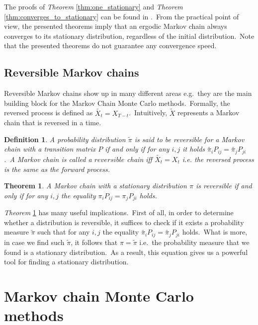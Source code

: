 \documentclass[shortabstract, english, lic]{iithesis}
\newcommand\numberedchapter[1]{\setlength\topskip{3cm}\chapter{#1}\setlength\topskip{0cm}}
\theoremstyle{default_theorem_style}\newtheorem{theorem}{Theorem}
\theoremstyle{default_theorem_style}\newtheorem{definition}{Definition}
\begin{document}
\noindent The proofs of \textit{Theorem} \ref{thm:one_stationary} and \textit{Theorem}
\ref{thm:converges_to_stationary} can be found in \cite{markov_chains_book}.\ From the practical point of view, the
presented theorems imply that an ergodic Markov chain always converges to its stationary distribution, regardless of
the initial distribution.\ Note that the presented theorems do not guarantee any convergence speed.

\section{Reversible Markov chains}

Reversible Markov chains show up in many different areas e.g.\ they are the main building block for the Markov
Chain Monte Carlo methods.\ Formally, the reversed process is defined as $\tilde{X_t} = X_{T - t}$.\ Intuitively,
$\tilde{X}$ represents a Markov chain that is reversed in a time.

\begin{definition}
A probability distribution $\tilde{\pi}$ is said to be \textit{reversible} for a Markov chain with a transition
matrix $P$ if and only if for any $i,j$ it holds $\tilde{\pi_i} P_{ij} = \tilde{\pi_j} P_{ji}$.\ A Markov chain
is called a $reversible$ chain iff $\tilde{X_t} = X_t$ i.e. the reversed process is the same as the forward process.
\end{definition}

\begin{theorem}\label{reversible_chain}
A Markov chain with a stationary distribution $\pi$ is reversible if and only if for any $i, j$ the equality
$\pi_i P_{ij} = \pi_j P_{ji}$ holds.
\end{theorem}

\noindent \textit{Theorem} \ref{reversible_chain} has many useful implications.\ First of all, in order to determine
whether a distribution is reversible, it suffices to check if it exists a probability measure $\tilde{\pi}$ such that
for any $i, j$ the equality $\tilde{\pi_i} P_{ij} = \tilde{\pi_j} P_{ji}$ holds.\ What is more, in case we find such
$\tilde{\pi}$, it follows that $\pi = \tilde{\pi}$ i.e.\ the probability measure that we found is a stationary
distribution.\ As a result, this equation gives us a powerful tool for finding a stationary distribution.

\numberedchapter{Markov chain Monte Carlo methods}\label{chapter:mcmc}
\end{document}
